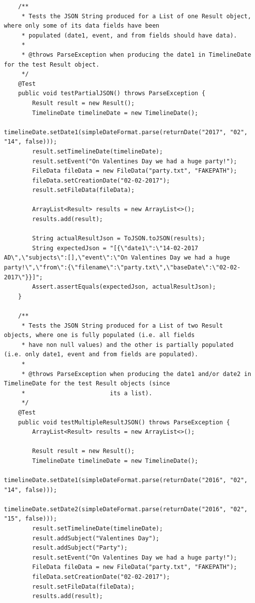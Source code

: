 \begin{lstlisting}
    /**
     * Tests the JSON String produced for a List of one Result object, where only some of its data fields have been
     * populated (date1, event, and from fields should have data).
     *
     * @throws ParseException when producing the date1 in TimelineDate for the test Result object.
     */
    @Test
    public void testPartialJSON() throws ParseException {
        Result result = new Result();
        TimelineDate timelineDate = new TimelineDate();
        timelineDate.setDate1(simpleDateFormat.parse(returnDate("2017", "02", "14", false)));
        result.setTimelineDate(timelineDate);
        result.setEvent("On Valentines Day we had a huge party!");
        FileData fileData = new FileData("party.txt", "FAKEPATH");
        fileData.setCreationDate("02-02-2017");
        result.setFileData(fileData);

        ArrayList<Result> results = new ArrayList<>();
        results.add(result);

        String actualResultJson = ToJSON.toJSON(results);
        String expectedJson = "[{\"date1\":\"14-02-2017 AD\",\"subjects\":[],\"event\":\"On Valentines Day we had a huge party!\",\"from\":{\"filename\":\"party.txt\",\"baseDate\":\"02-02-2017\"}}]";
        Assert.assertEquals(expectedJson, actualResultJson);
    }

    /**
     * Tests the JSON String produced for a List of two Result objects, where one is fully populated (i.e. all fields
     * have non null values) and the other is partially populated (i.e. only date1, event and from fields are populated).
     *
     * @throws ParseException when producing the date1 and/or date2 in TimelineDate for the test Result objects (since
     *                        its a list).
     */
    @Test
    public void testMultipleResultJSON() throws ParseException {
        ArrayList<Result> results = new ArrayList<>();

        Result result = new Result();
        TimelineDate timelineDate = new TimelineDate();
        timelineDate.setDate1(simpleDateFormat.parse(returnDate("2016", "02", "14", false)));
        timelineDate.setDate2(simpleDateFormat.parse(returnDate("2016", "02", "15", false)));
        result.setTimelineDate(timelineDate);
        result.addSubject("Valentines Day");
        result.addSubject("Party");
        result.setEvent("On Valentines Day we had a huge party!");
        FileData fileData = new FileData("party.txt", "FAKEPATH");
        fileData.setCreationDate("02-02-2017");
        result.setFileData(fileData);
        results.add(result);


\end{lstlisting}
